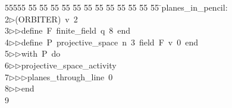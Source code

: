 %
%
\begin{tabbing}
55555 \= 55 \= 55 \= 55 \= 55 \= 55 \= 55 \= 55 \= 55 \= 55 \= 55 \= 55 \= 55 \= \>planes\_in\_pencil:\\[0pt]
2\>$\triangleright$\>(ORBITER)\ v\ 2\ \\[0pt]
3\>$\triangleright$\>$\triangleright$\>define\ F\ finite\_field\ q\ 8\ end\ \\[0pt]
4\>$\triangleright$\>$\triangleright$\>define\ P\ projective\_space\ n\ 3\ field\ F\ v\ 0\ end\ \\[0pt]
5\>$\triangleright$\>$\triangleright$\>with\ P\ do\ \\[0pt]
6\>$\triangleright$\>$\triangleright$\>projective\_space\_activity\ \\[0pt]
7\>$\triangleright$\>$\triangleright$\>$\triangleright$\>planes\_through\_line\ 0\ \\[0pt]
8\>$\triangleright$\>$\triangleright$\>end\\[0pt]
9\>\end{tabbing}

